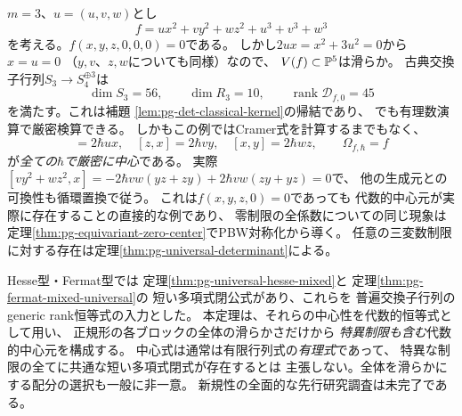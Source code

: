\begin{example}[三変数制限が恒等的零でも中心元を得る]
\label{ex:pg-det-zero-ternary}
$m=3$、$u=(u,v,w)$とし
\begin{equation}
 f=u x^2+v y^2+w z^2+u^3+v^3+w^3
 \label{eq:pg-det-zero-ternary-example}
\end{equation}
を考える。$f(x,y,z,0,0,0)=0$である。
しかし$2ux=x^2+3u^2=0$から$x=u=0$
（$y,v$、$z,w$についても同様）なので、
$V(f)\subset\mathbb P^5$は滑らか。
古典交換子行列$S_3\to S_4^{\oplus3}$は
\begin{equation}
 \dim S_3=56,\qquad
 \dim R_3=10,\qquad
 \operatorname{rank}\mathcal D_{f,0}=45
 \label{eq:pg-det-zero-ternary-rank}
\end{equation}
を満たす。これは補題
\ref{lem:pg-det-classical-kernel}の帰結であり、
でも有理数演算で厳密検算できる。
しかもこの例ではCramer式を計算するまでもなく、
\begin{equation}
 [y,z]=2\hbar ux,\quad
 [z,x]=2\hbar vy,\quad
 [x,y]=2\hbar wz,
 \qquad
 \Omega_{f,\hbar}=f
 \label{eq:pg-det-zero-ternary-explicit}
\end{equation}
が\emph{全ての$\hbar$で厳密に中心}である。
実際
$[vy^2+wz^2,x]
=-2\hbar vw(yz+zy)+2\hbar vw(zy+yz)=0$で、
他の生成元との可換性も循環置換で従う。
これは$f(x,y,z,0)=0$であっても
代数的中心元が実際に存在することの直接的な例であり、
零制限の全係数についての同じ現象は
定理\ref{thm:pg-equivariant-zero-center}でPBW対称化から導く。
任意の三変数制限に対する存在は定理\ref{thm:pg-universal-determinant}による。
\end{example}

\begin{remark}[先行研究と確実性]
\label{rem:pg-det-scope}
Hesse型・Fermat型では
定理\ref{thm:pg-universal-hesse-mixed}と
定理\ref{thm:pg-fermat-mixed-universal}の
短い多項式閉公式があり、これらを
普遍交換子行列のgeneric rank恒等式の入力とした。
本定理は、それらの中心性を代数的恒等式として用い、
正規形の各ブロックの全体の滑らかさだけから
\emph{特異制限も含む}代数的中心元を構成する。
中心式は通常は有限行列式の\emph{有理式}であって、
特異な制限の全てに共通な短い多項式閉式が存在するとは
主張しない。全体を滑らかにする配分の選択も一般に非一意。
新規性の全面的な先行研究調査は未完了である。
\end{remark}
